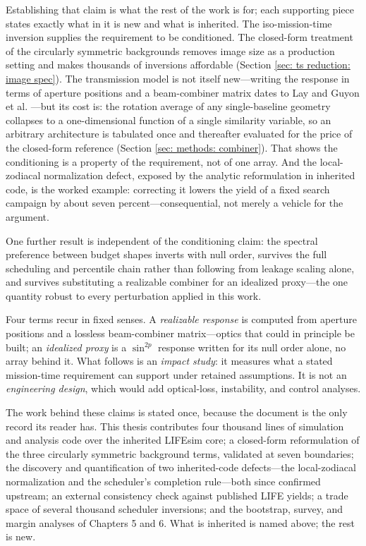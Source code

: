 \documentclass[12pt,a4paper]{article}
\numberwithin{equation}{section}
\numberwithin{figure}{section}
\numberwithin{table}{section}
\begin{document}
Establishing that claim is what the rest of the work is for; each supporting piece states exactly what in it is new and what is inherited. The iso-mission-time inversion supplies the requirement to be conditioned. The closed-form treatment of the circularly symmetric backgrounds removes image size as a production setting and makes thousands of inversions affordable (Section \ref{sec: ts reduction: image spec}). The transmission model is not itself new---writing the response in terms of aperture positions and a beam-combiner matrix dates to Lay \cite{lay2004systematic} and Guyon et al. \cite{guyon2013beam}---but its cost is: the rotation average of any single-baseline geometry collapses to a one-dimensional function of a single similarity variable, so an arbitrary architecture is tabulated once and thereafter evaluated for the price of the closed-form reference (Section \ref{sec: methods: combiner}). That shows the conditioning is a property of the requirement, not of one array. And the local-zodiacal normalization defect, exposed by the analytic reformulation in inherited code, is the worked example: correcting it lowers the yield of a fixed search campaign by about seven percent---consequential, not merely a vehicle for the argument.

One further result is independent of the conditioning claim: the spectral preference between budget shapes inverts with null order, survives the full scheduling and percentile chain rather than following from leakage scaling alone, and survives substituting a realizable combiner for an idealized proxy---the one quantity robust to every perturbation applied in this work.

Four terms recur in fixed senses. A \textit{realizable response} is computed from aperture positions and a lossless beam-combiner matrix---optics that could in principle be built; an \textit{idealized proxy} is a $\sin^{2p}$ response written for its null order alone, no array behind it. What follows is an \textit{impact study}: it measures what a stated mission-time requirement can support under retained assumptions. It is not an \textit{engineering design}, which would add optical-loss, instability, and control analyses.

The work behind these claims is stated once, because the document is the only record its reader has. This thesis contributes four thousand lines of simulation and analysis code over the inherited LIFEsim core; a closed-form reformulation of the three circularly symmetric background terms, validated at seven boundaries; the discovery and quantification of two inherited-code defects---the local-zodiacal normalization and the scheduler's completion rule---both since confirmed upstream; an external consistency check against published LIFE yields; a trade space of several thousand scheduler inversions; and the bootstrap, survey, and margin analyses of Chapters 5 and 6. What is inherited is named above; the rest is new.
\end{document}
